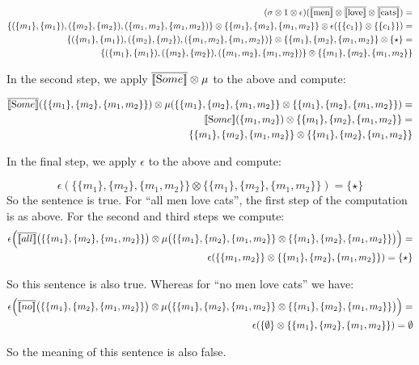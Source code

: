 \begin{align*}
(\sigma \otimes 1 \otimes \epsilon)(\overline{[\![ \text{men} ]\!]} \otimes \overline{[\![ \text{love} ]\!]} \otimes \overline{[\![ \text{cats} ]\!]}) =& \\
   \{(\{m_1\}, \{m_1\}), (\{m_2\}, \{m_2\}), (\{m_1, m_2\}, \{m_1, m_2\}) \} \otimes
   \{\{m_1\}, \{m_2\}, \{m_1, m_2\}\} \otimes \epsilon(\{\{c_1\}\} \otimes \{\{c_1\}\}) = \\
     \{(\{m_1\}, \{m_1\}), (\{m_2\}, \{m_2\}), (\{m_1, m_2\}, \{m_1, m_2\}) \} \otimes
   \{\{m_1\}, \{m_2\}, \{m_1, m_2\}\} \otimes  \{\star\}  = \\
     \{(\{m_1\}, \{m_1\}), (\{m_2\}, \{m_2\}), (\{m_1, m_2\}, \{m_1, m_2\}) \} \otimes
   \{\{m_1\}, \{m_2\}, \{m_1, m_2\}\}  
\end{align*}

\noindent
In the second step, we apply $\overline{[\![ \text Some ]\!]} \otimes \mu$ to the above and compute:

\begin{align*}
\overline{\semantics{\text Some}} (\{\{m_1\}, \{m_2\}, \{m_1, m_2\}\}) \otimes \mu(\{\{m_1\}, \{m_2\}, \{m_1, m_2\}\} \otimes \{\{m_1\}, \{m_2\}, \{m_1, m_2\}\}) = \\
 \semantics{\text Some}(\{m_1, m_2\})  \otimes \{\{m_1\}, \{m_2\}, \{m_1, m_2\}\} = \\
\{\{m_1\}, \{m_2\}, \{m_1,m_2\}\} \otimes   \{\{m_1\}, \{m_2\}, \{m_1, m_2\}\}\\
\end{align*}

\noindent
In the final step, we apply $\epsilon$ to the above and compute:

\[
\epsilon(\{\{m_1\}, \{m_2\}, \{m_1,m_2\}\} \otimes   \{\{m_1\}, \{m_2\}, \{m_1, m_2\}\}) = \{\star\}
\]
So the sentence is true. For ``all men love cats'', the first step of the computation is as above. For the second and third steps we compute:
\begin{align*}
\epsilon\Big(\overline{[\![ all ]\!]} \big(\{\{m_1\}, \{m_2\}, \{m_1, m_2\}\}\big) \otimes  \mu \big(\{\{m_1\}, \{m_2\}, \{m_1, m_2\}\} \otimes \{\{m_1\}, \{m_2\}, \{m_1, m_2\}\}\big)\Big)=\\
\epsilon(\{\{m_1, m_2\}\} \otimes  \{\{m_1\}, \{m_2\}, \{m_1, m_2\}\}) = \{\star\}
\end{align*}

\noindent
So this sentence is also true. Whereas for ``no men love cats'' we have:
\begin{align*}
\epsilon\Big(\overline{[\![ no ]\!]} \big(\{\{m_1\}, \{m_2\}, \{m_1, m_2\}\}\big) \otimes  \mu \big(\{\{m_1\}, \{m_2\}, \{m_1, m_2\}\} \otimes \{\{m_1\}, \{m_2\}, \{m_1, m_2\}\}\big)\Big)=\\
\epsilon(\{\emptyset\} \otimes  \{\{m_1\}, \{m_2\}, \{m_1, m_2\}\}) =\emptyset
\end{align*}

\noindent
So the meaning of this sentence is also false.  







